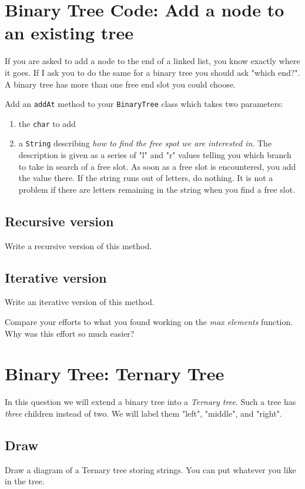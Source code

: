 \documentclass[twoside=false,DIV=14]{scrartcl}
\begin{document}
\section{Binary Tree Code: Add a node to an existing tree}
If you are asked to add a node to the end of a linked list, you know exactly where it goes.  If I ask you to do the same for a binary tree you should ask "which end?".  A binary tree has more than one free end slot you could choose.

Add an \verb+addAt+ method to your \verb+BinaryTree+ class which takes two parameters:
\begin{enumerate}
\item the \verb+char+ to add
\item a \verb+String+ describing \emph{how to find the free spot we are interested in}.  The description is given as a series of "l" and "r" values telling you which branch to take in search of a free slot.  As soon as a free slot is encountered, you add the value there.  If the string runs out of letters, do nothing.  It is not a problem if there are letters remaining in the string when you find a free slot.
\end{enumerate}

\subsection{Recursive version}
Write a recursive version of this method.

\subsection{Iterative version}
Write an iterative version of this method.

Compare your efforts to what you found working on the \emph{max elements} function.  Why was this effort so much easier?

\section{Binary Tree: Ternary Tree}
In this question we will extend a binary tree into a \emph{Ternary tree}.  Such a tree has \emph{three} children instead of two.  We will label them "left", "middle", and "right".
\subsection{Draw}
Draw a diagram of a Ternary tree storing strings.  You can put whatever you like in the tree.
\end{document}
